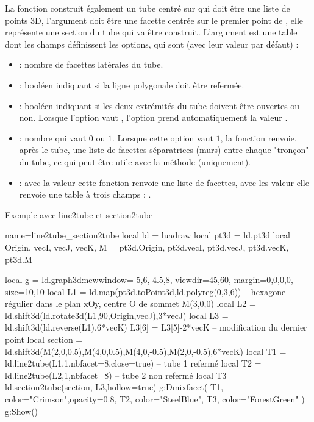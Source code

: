 La fonction  construit également un tube centré sur  qui doit être une liste de points 3D, l'argument  doit être une facette centrée sur le premier point de , elle représente une section du tube qui va être construit. L'argument  est une table dont les champs définissent les options, qui sont (avec leur valeur  par défaut) :
    \begin{itemize}
        \item {} : nombre de facettes latérales du tube.
        
        \item {} : booléen indiquant si la ligne polygonale doit être refermée.
        
        \item {} : booléen indiquant si les deux extrémités du tube doivent être ouvertes ou non. Lorsque l'option  vaut \true, l'option  prend automatiquement la valeur \true.
        
        \item {} : nombre qui vaut $0$ ou $1$. Lorsque cette option vaut $1$, la fonction renvoie, après le tube, une liste de facettes séparatrices (murs) entre chaque "tronçon" du tube, ce qui peut être utile avec la méthode  (uniquement).
        
        \item {} : avec la valeur \false cette fonction renvoie une liste de facettes, avec les valeur \true elle renvoie une table à trois champs : .        
    \end{itemize}
    
\begin{demo}{Exemple avec line2tube et section2tube}
\begin{luadraw}{name=line2tube_section2tube}
local ld = luadraw
local pt3d = ld.pt3d
local Origin, vecI, vecJ, vecK, M = pt3d.Origin, pt3d.vecI, pt3d.vecJ, pt3d.vecK, pt3d.M

local g = ld.graph3d:new{window={-5,6,-4.5,8}, viewdir={45,60}, margin={0,0,0,0}, size={10,10}}
local L1 = ld.map(pt3d.toPoint3d,ld.polyreg(0,3,6)) -- hexagone régulier dans le plan xOy, centre O de sommet M(3,0,0)
local L2 = ld.shift3d(ld.rotate3d(L1,90,{Origin,vecJ}),3*vecJ)
local L3 = ld.shift3d(ld.reverse(L1),6*vecK)
L3[6] = L3[5]-2*vecK -- modification du dernier point
local section = ld.shift3d({M(2,0,0.5),M(4,0,0.5),M(4,0,-0.5),M(2,0,-0.5)},6*vecK)
local T1 = ld.line2tube(L1,1,{nbfacet=8,close=true}) -- tube 1 refermé
local T2 = ld.line2tube(L2,1,{nbfacet=8}) -- tube 2 non refermé
local T3 = ld.section2tube(section, L3,{hollow=true})
g:Dmixfacet( T1, {color="Crimson",opacity=0.8}, T2, {color="SteelBlue"}, T3, {color="ForestGreen"} )
g:Show()
\end{luadraw}
\end{demo}


